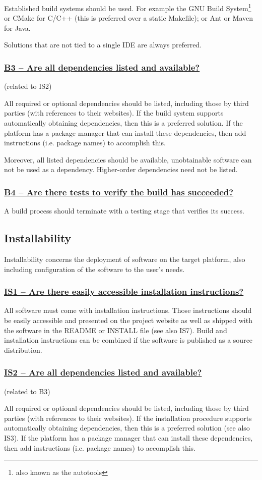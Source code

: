 \documentclass[a4paper,11pt]{article}
\newcommand{\indicator}[1]{\subsubsection*{\underline{#1}}}
\begin{document}
Established build systems should be used. For example the GNU Build
System\footnote{also known as the autotools} or CMake for C/C++ (this is
preferred over a static Makefile); or Ant or Maven for Java. 

Solutions that are not tied to a single IDE are always preferred.

\indicator{B3 -- Are all dependencies listed and available?}
(related to IS2)

All required or optional dependencies should be listed, including those by
third parties (with references to their websites). If the build system supports
automatically obtaining dependencies, then this is a preferred solution. If the
platform has a package manager that can install these dependencies, then add
instructions (i.e. package names) to accomplish this.

Moreover, all listed dependencies should be available, unobtainable software
can not be used as a dependency. Higher-order dependencies need not be listed.

\indicator{B4 -- Are there tests to verify the build has succeeded?}

A build process should terminate with a testing stage that verifies its success.

\subsection{Installability}

Installability concerns the deployment of software on the target platform, also
including configuration of the software to the user's needs.

\indicator{IS1 -- Are there easily accessible installation instructions?}

All software must come with installation instructions. Those instructions should
be easily accessible and presented on the project website as well as shipped
with the software in the README or INSTALL file (see also IS7). Build and installation
instructions can be combined if the software is published as a source
distribution.

\indicator{IS2 -- Are all dependencies listed and available?}
(related to B3)

All required or optional dependencies should be listed, including those by
third parties (with references to their websites). If the installation
procedure supports automatically obtaining dependencies, then this is a
preferred solution (see also IS3). If the platform has a package manager that
can install these dependencies, then add instructions (i.e. package names) to
accomplish this.
\end{document}
